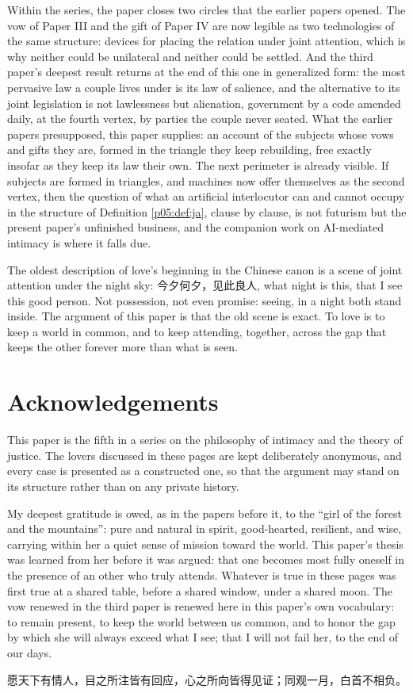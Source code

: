 \documentclass[11pt,a4paper]{article}
\newcommand{\zh}[1]{{\cjkfont #1}}
\theoremstyle{seriesthm}
\begin{document}
Within the series, the paper closes two circles that the earlier papers opened. The vow of Paper III and the gift of Paper IV are now legible as two technologies of the same structure: devices for placing the relation under joint attention, which is why neither could be unilateral and neither could be settled. And the third paper's deepest result returns at the end of this one in generalized form: the most pervasive law a couple lives under is its law of salience, and the alternative to its joint legislation is not lawlessness but alienation, government by a code amended daily, at the fourth vertex, by parties the couple never seated. What the earlier papers presupposed, this paper supplies: an account of the subjects whose vows and gifts they are, formed in the triangle they keep rebuilding, free exactly insofar as they keep its law their own. The next perimeter is already visible. If subjects are formed in triangles, and machines now offer themselves as the second vertex, then the question of what an artificial interlocutor can and cannot occupy in the structure of Definition \ref{p05:def:ja}, clause by clause, is not futurism but the present paper's unfinished business, and the companion work on AI-mediated intimacy is where it falls due.

The oldest description of love's beginning in the Chinese canon is a scene of joint attention under the night sky: \zh{今夕何夕，见此良人}, what night is this, that I see this good person. Not possession, not even promise: seeing, in a night both stand inside. The argument of this paper is that the old scene is exact. To love is to keep a world in common, and to keep attending, together, across the gap that keeps the other forever more than what is seen.

\section*{Acknowledgements}

This paper is the fifth in a series on the philosophy of intimacy and the theory of justice. The lovers discussed in these pages are kept deliberately anonymous, and every case is presented as a constructed one, so that the argument may stand on its structure rather than on any private history.

My deepest gratitude is owed, as in the papers before it, to the ``girl of the forest and the mountains'': pure and natural in spirit, good-hearted, resilient, and wise, carrying within her a quiet sense of mission toward the world. This paper's thesis was learned from her before it was argued: that one becomes most fully oneself in the presence of an other who truly attends. Whatever is true in these pages was first true at a shared table, before a shared window, under a shared moon. The vow renewed in the third paper is renewed here in this paper's own vocabulary: to remain present, to keep the world between us common, and to honor the gap by which she will always exceed what I see; that I will not fail her, to the end of our days.

\begin{center}
{\zh{愿天下有情人，目之所注皆有回应，心之所向皆得见证；同观一月，白首不相负。}}
\end{center}

\printbibliography[heading=bibintoc]
\end{document}
